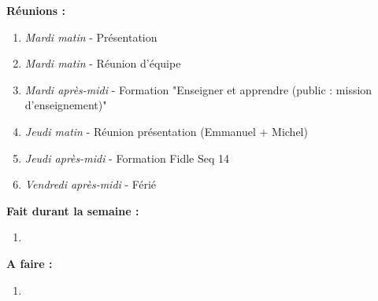 \textbf{Réunions :}
\begin{enumerate}[label=\textbullet]
	\item \textit{Mardi matin} - Présentation
	\item \textit{Mardi matin} - Réunion d'équipe
	\item \textit{Mardi après-midi} - Formation "Enseigner et apprendre (public : mission d'enseignement)"
	\item \textit{Jeudi matin} - Réunion présentation (Emmanuel + Michel)
	\item \textit{Jeudi après-midi} - Formation Fidle Seq 14
	\item \textit{Vendredi après-midi} - Férié
\end{enumerate}
\textbf{Fait durant la semaine :}
\begin{enumerate}[label=\textbullet]
	\item 
\end{enumerate}
\textbf{A faire :}
\begin{enumerate}[label=\textbullet]
	\item 
\end{enumerate}